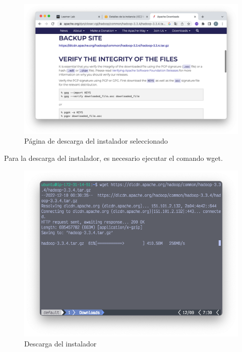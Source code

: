 \begin{figure}[h]
	\centering
	\includegraphics[scale=.35] {img/17-hadoop-tar-gz}
	\caption{Página de descarga del instalador seleccionado}
	\label{fig:17}
\end{figure}

\clearpage

Para la descarga del instalador, es necesario ejecutar el comando wget. 
\begin{figure}[h]
	\centering
	\includegraphics[scale=.35] {img/18-wgetHadoop}
	\caption{Descarga del instalador}
	\label{fig:18}
\end{figure}

